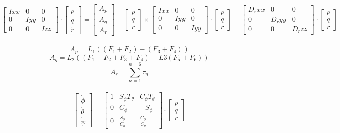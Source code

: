 \documentclass[12pt,a4paper,twoside]{report}
\begin{document}
				 	$$ 
				 	\begin{bmatrix}
				 	Ixx & 0 & 0 \\
				 	0 & Iyy & 0 \\
				 	0 & 0 & Izz
				 	\end{bmatrix}
				 	\cdot 
				 	\begin{bmatrix}
				 	\dot{p} \\
				 	\dot{q} \\
				 	\dot{r}
				 	\end{bmatrix}
				 	=
				 	\begin{bmatrix}
				 	A_p \\
				 	A_q \\
				 	A_r
				 	\end{bmatrix}
				 	-
				 	\begin{bmatrix}
				 	p \\
				 	q \\
				 	r 
				 	\end{bmatrix}
				 	\times
				 	\begin{bmatrix}
				 	Ixx & 0 & 0 \\
				 	0 & Iyy & 0 \\
				 	0 & 0 & Iyy
				 	\end{bmatrix}
				 	\cdot
				 	\begin{bmatrix}
				 	p \\
				 	q \\
				 	r 
				 	\end{bmatrix}
				 	-
				 	\begin{bmatrix}
				 	D_rxx & 0 & 0 \\
				 	0 & D_ryy & 0 \\
				 	0 & 0 & D_rzz
				 	\end{bmatrix}
				 	\cdot
				 	\begin{bmatrix}
				 	p \\
				 	q \\
				 	r
				 	\end{bmatrix}
				 	$$ 
				 	\\
				 	\[ A_p = L_1 ((F_1+F_2) - (F_3+F_4)) \]
				 	\[ A_q = L_2 ((F_1+F_2+F_3+F_4) - L3 (F_5+F_6)) \]
				 	\[ A_r = \sum_{n = 1}^{n = 6}\tau_n \]
				 	\\
				 	$$
				 	\begin{bmatrix}
				 	\dot{\phi} \\
				 	\dot{\theta} \\
				 	\dot{\psi}
				 	\end{bmatrix}
				 	=
				 	\begin{bmatrix}
				 	1 & S_\phi T_\theta & C_\phi T_\theta \\
				 	0 & C_\phi & -S_\phi\\
				 	0 & \frac{S_\phi}{C_\theta}  & \frac{C_\phi}{C_\theta}
				 	\end{bmatrix}
				 	\cdot
				 	\begin{bmatrix}
				 	p \\
				 	q \\
				 	r 
				 	\end{bmatrix}
				 	$$ 
\end{document}

